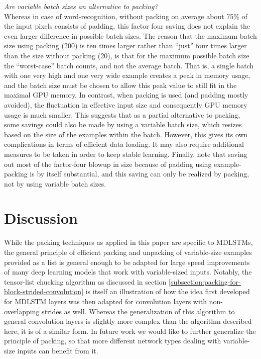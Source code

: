 \documentclass[conference]{IEEEtran}
\renewcommand{\ac}[1]{\gls{#1}}
\renewcommand{\acp}[1]{\glspl{#1}}
\begin{document}
\textit{Are variable batch sizes an alternative to packing?}\\
Whereas in case of word-recognition, without packing on average about 75\% of the input pixels consists of padding, this factor four saving does not 
explain the even larger difference in possible batch sizes. The reason that the maximum batch size using packing (200) is ten times larger rather than ``just'' four times 
larger than the size without packing (20), is that for the maximum possible batch size the ``worst-case'' batch counts, and not the average batch. 
That is, a single batch with one very high and one very wide example creates a peak in memory usage, and the batch size must be chosen to allow this peak value 
to still fit in the maximal GPU memory. In contrast, when packing is used (and padding mostly avoided), the fluctuation in effective input size and consequently GPU
memory usage is much smaller.
This suggests that as a partial alternative to packing, some savings could also be made by using a variable batch size, which resizes 
based on the size of the examples within the batch.
However, this gives its own complications in terms of efficient data loading. It may also require additional measures to be taken in order to keep stable learning. Finally, note that saving out most of the factor-four blowup in size because of padding using example-packing is by itself substantial, and this saving can only be realized by packing, 
not by using variable batch sizes.




\section{Discussion}
While the packing techniques as applied in this paper are specific to \acp{MDLSTM}, the general principle 
of efficient packing and unpacking of variable-size examples provided as a list is general enough to be adapted for large speed 
improvements of many deep learning models that work with variable-sized inputs. Notably, the tensor-list chucking algorithm as discussed in 
section \ref{subsection:packing-for-block-strided-convolution} is itself an illustration of how the idea first developed for \ac{MDLSTM}
layers was then adapted for convolution layers with non-overlapping strides as well. Whereas the generalization of this algorithm to 
general convolution layers is slightly more complex than the algorithm described here, it is of a similar form.
In future work we would like to further generalize the principle of packing, so that more different network types dealing with variable-size 
inputs can benefit from it.
\end{document}
